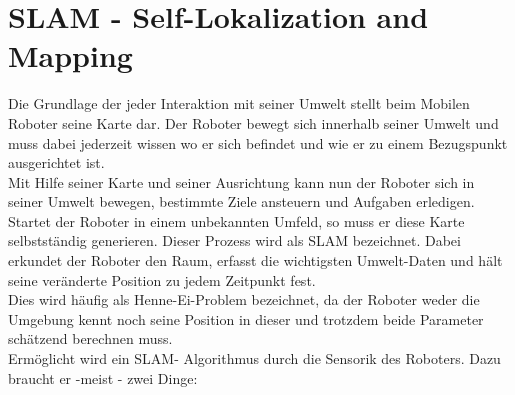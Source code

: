 \documentclass[a4paper,cleardoubleempty,BCOR1cm]{book}
\begin{document}
\section{SLAM - Self-Lokalization and Mapping }
Die Grundlage der jeder Interaktion mit seiner Umwelt stellt beim Mobilen Roboter seine Karte dar. Der Roboter bewegt sich innerhalb seiner Umwelt und muss dabei jederzeit wissen wo er sich befindet und wie er zu einem Bezugspunkt ausgerichtet ist. \\
Mit Hilfe seiner Karte und seiner Ausrichtung kann nun der Roboter sich in seiner Umwelt bewegen, bestimmte Ziele ansteuern und Aufgaben erledigen. Startet der Roboter in einem unbekannten Umfeld, so muss er diese Karte selbstständig generieren. Dieser Prozess wird als SLAM bezeichnet. Dabei erkundet der Roboter den Raum, erfasst die wichtigsten Umwelt-Daten und hält seine veränderte Position zu jedem Zeitpunkt fest. \\
Dies wird häufig als Henne-Ei-Problem bezeichnet, da der Roboter weder die Umgebung kennt noch seine Position in dieser und trotzdem beide Parameter schätzend berechnen muss. \\
Ermöglicht wird ein SLAM- Algorithmus durch die Sensorik des Roboters. Dazu braucht er -meist - zwei Dinge: 
\end{document}
